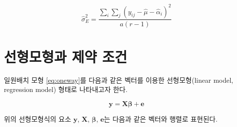 \documentclass[
  10pt,
]{book}
\theoremstyle{definition}
\theoremstyle{definition}
\theoremstyle{definition}
\theoremstyle{definition}
\theoremstyle{remark}
\begin{document}
\begin{equation*} 
\hat \sigma_E^2 = \frac{ \sum_i \sum_j (y_{ij} - \hat \mu -\hat \alpha_i )^2}{a(r-1)}
\end{equation*}

\hypertarget{uxc120uxd615uxbaa8uxd615uxacfc-uxc81cuxc57d-uxc870uxac74}{%
\section{선형모형과 제약 조건}\label{uxc120uxd615uxbaa8uxd615uxacfc-uxc81cuxc57d-uxc870uxac74}}

일원배치 모형 \eqref{eq:oneway}를 다음과 같은 벡터를 이용한 선형모형(linear model, regression model) 형태로 나타내고자 한다.

\begin{equation}
\bm y = \bm X \bm \beta +\bm e
\label{eq:lm}
\end{equation}

위의 선형모형식의 요소 \(\bm y\), \(\bm X\), \(\bm \beta\), \(\bm e\)는 다음과 같은 벡터와 행렬로 표현된다.
\end{document}
